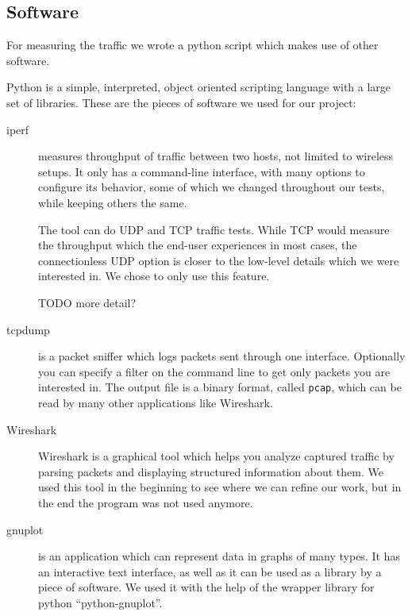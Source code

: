 \subsection{Software} \label{setup:software}



\noindent
For measuring the traffic we wrote a python script which makes use of other software.

Python is a simple, interpreted, object oriented scripting language with a large set of libraries.
These are the pieces of software we used for our project:

\begin{description}
	\item[iperf]
		measures throughput of traffic between two hosts, not limited to wireless setups.
		It only has a command-line interface, with many options to configure its behavior, some of which we changed throughout our tests, while keeping others the same.

		The tool can do UDP and TCP traffic tests.
		While TCP would measure the throughput which the end-user experiences in most cases, the connectionless UDP option is closer to the low-level details which we were interested in. We chose to only use this feature.

		TODO more detail?

	\item[tcpdump]
		is a packet sniffer which logs packets sent through one interface. Optionally you can specify a filter on the command line to get only packets you are interested in.
		The output file is a binary format, called {\tt pcap}, which can be read by many other applications like Wireshark.
		
	\item[Wireshark]
		Wireshark is a graphical tool which helps you analyze captured traffic by parsing packets and displaying structured information about them.
		We used this tool in the beginning to see where we can refine our work, but in the end the program was not used anymore.

	\item[gnuplot]
		is an application which can represent data in graphs of many types. It has an interactive text interface, as well as it can be used as a library by a piece of software. We used it with the help of the wrapper library for python ``python-gnuplot''.

\end{description}
